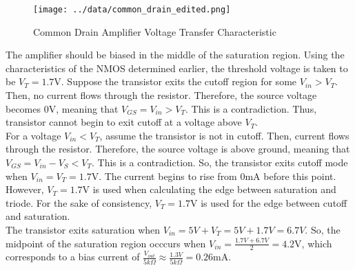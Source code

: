\FloatBarrier

\begin{figure}[h!]
	\centering
	\texttt{[image: ../data/common\_drain\_edited.png]}
	\caption{Common Drain Amplifier Voltage Transfer Characteristic}
	\label{fig:common_drain}
\end{figure}

\FloatBarrier

The amplifier should be biased in the middle of the saturation region. Using the characteristics of the NMOS determined earlier, the threshold voltage is taken to be $V_T = 1.7$\si{\volt}. Suppose the transistor exits the cutoff region for some $V_{in} > V_T$. Then, no current flows through the resistor. Therefore, the source voltage becomes $0$\si{\volt}, meaning that $V_{GS} = V_{in} > V_T$. This is a contradiction. Thus, transistor cannot begin to exit cutoff at a voltage above $V_T$. \\

For a voltage $V_{in} < V_T$, assume the transistor is not in cutoff. Then, current flows through the resistor.
Therefore, the source voltage is above ground, meaning that $V_{GS} = V_{in} - V_S < V_T$.
This is a contradiction.
So, the transistor exits cutoff mode when $V_{in} = V_T = 1.7$\si{\volt}. The current begins to rise from $0$\si{\milli\ampere} before this point.
However, $V_T = 1.7$\si{\volt} is used when calculating the edge between saturation and triode. For the sake of consistency, $V_T = 1.7$\si{\volt} is used for the edge between cutoff and saturation. \\

The transistor exits saturation when $V_{in} = 5V + V_T = 5V + 1.7V = 6.7V$. 
So, the midpoint of the saturation region occcurs when $V_{in} = \frac{1.7V + 6.7V}{2} = 4.2$\si{\volt}, which corresponds to a bias current of $\frac{V_{out}}{5k\Omega} \approx \frac{1.3V}{5k\Omega} = 0.26$\si{\milli\ampere}.
